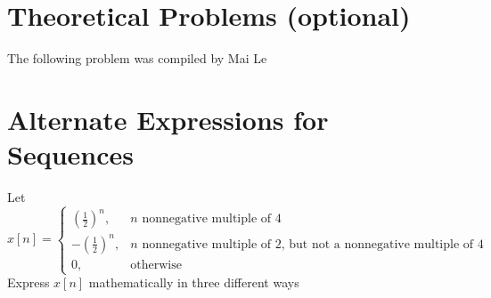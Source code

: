 \documentclass[11pt]{article}
\begin{document}
\section*{Theoretical Problems (optional)}
The following problem was compiled by Mai Le

\section{Alternate Expressions for Sequences}
Let $x[n] = \begin{cases} \left(\frac{1}{2}\right)^n, & n \text{ nonnegative multiple of 4} \\ -\left(\frac{1}{2}\right)^n, & n \text{ nonnegative multiple of 2, but not a nonnegative multiple of 4} \\ 0, & \text{otherwise}\end{cases}$ \\
Express $x[n]$ mathematically in three different ways
\end{document}
